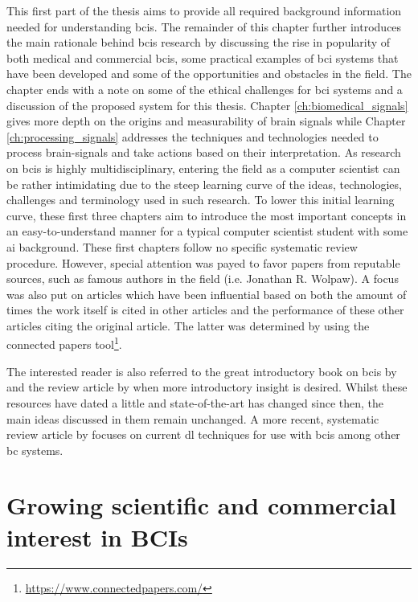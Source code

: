 This first part of the thesis aims to provide all required background information needed for understanding \glspl{bci}.
The remainder of this chapter further introduces the main rationale behind \glspl{bci} research by discussing the rise in popularity of both medical and commercial \glspl{bci}, some practical examples of \gls{bci} systems that have been developed and some of the opportunities and obstacles in the field. The chapter ends with a note on some of the ethical challenges for \gls{bci} systems and a discussion of the proposed system for this thesis.
Chapter \ref{ch:biomedical_signals} gives more depth on the origins and measurability of brain signals while Chapter \ref{ch:processing_signals} addresses the techniques and technologies needed to process brain-signals and take actions based on their interpretation. 
As research on \glspl{bci} is highly multidisciplinary, entering the field as a computer scientist can be rather intimidating due to the steep learning curve of the ideas, technologies, challenges and terminology used in such research.
To lower this initial learning curve, these first three chapters aim to introduce the most important concepts in an easy-to-understand manner for a typical computer scientist student with some \gls{ai} background.
These first chapters follow no specific systematic review procedure.
However, special attention was payed to favor papers from reputable sources, such as famous authors in the field (i.e. Jonathan R. Wolpaw).
A focus was also put on articles which have been influential based on both the amount of times the work itself is cited in other articles and the performance of these other articles citing the original article.
The latter was determined by using the connected papers tool\footnote{\url{https://www.connectedpapers.com/}}.

The interested reader is also referred to the great introductory book on \glspl{bci} by \citet{bci_book} and the review article by \citet{bci_review} when more introductory insight is desired.
Whilst these resources have dated a little and state-of-the-art has changed since then, the main ideas discussed in them remain unchanged.
A more recent, systematic review article by \citet{bci_review_arnau} focuses on current \gls{dl} techniques for use with \glspl{bci} among other \gls{bc} systems.



\section{Growing scientific and commercial interest in BCIs}
\label{sec:bci_gaining_popularity}

